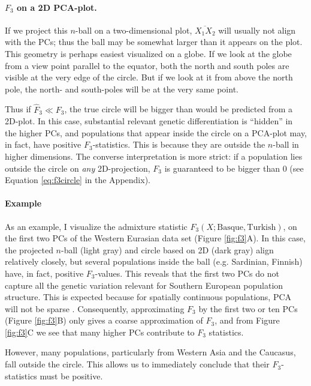 \documentclass[12pt,fullpage, a4paper]{article}
\begin{document}
\paragraph{$F_3$ on a 2D PCA-plot.} 
 If we project this $n$-ball on a two-dimensional plot, $\overline{X_1X_2}$ will usually not align with the PCs; thus the ball may be somewhat larger than it appears on the plot. This geometry is perhaps easiest visualized on a globe. If we look at the globe from a view point parallel to the equator, both the north and south poles are visible at the very edge of the circle. But if we look at it from above the north pole, the north- and south-poles will be at the very same point.
 
 Thus if $\hat{F}_3 \ll F_3$, the true circle will be bigger than would be predicted from a 2D-plot. In this case, substantial relevant genetic differentiation is ``hidden'' in the higher PCs, and populations that appear inside the circle on a PCA-plot may, in fact, have positive $F_3$-statistics. This is because they are outside the $n$-ball in higher dimensions. The converse interpretation is more strict: if a population lies outside the circle on \emph{any} 2D-projection, $F_3$ is guaranteed to be bigger than 0 (see Equation \ref{eq:f3circle} in the Appendix).

\paragraph{Example}
As an example, I visualize the admixture statistic $F_3(X; \text{Basque}, \text{Turkish})$, on the first two PCs of the Western Eurasian data set (Figure \ref{fig:f3}A). In this case, the projected $n$-ball (light gray) and circle based on 2D (dark gray) align relatively closely, but several populations inside the ball (e.g. Sardinian, Finnish) have, in fact, positive $F_3$-values. This reveals that the first two PCs do not capture all the genetic variation relevant for Southern European population structure. This is expected because for spatially continuous populations, PCA will not be sparse \citep{novembre2008a}.  Consequently, approximating $F_3$ by the first two or ten PCs (Figure \ref{fig:f3}B) only gives a coarse approximation of $F_3$, and from Figure \ref{fig:f3}C we see that many higher PCs contribute to $F_3$ statistics.

However, many populations, particularly from Western Asia and the Caucasus, fall outside the circle. This allows us to immediately conclude that their $F_3$-statistics must be positive.
\end{document}
